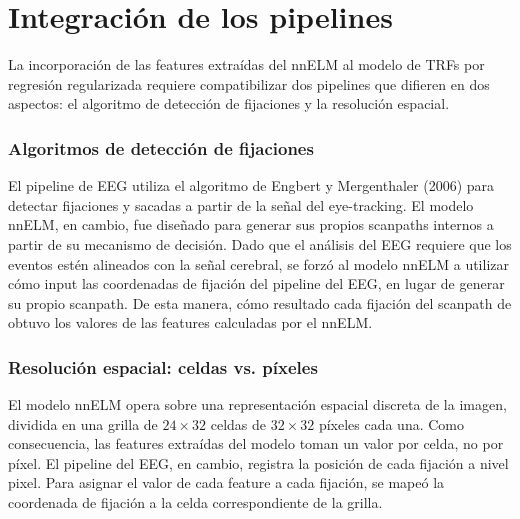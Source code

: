 \section{Integración de los pipelines}
\label{sec:celdas_vs_pixeles}


La incorporación de las features extraídas del nnELM al modelo de TRFs por regresión regularizada requiere compatibilizar dos pipelines que difieren en dos aspectos: el algoritmo de detección de fijaciones y la resolución espacial.

\subsubsection{Algoritmos de detección de fijaciones}

El pipeline de EEG utiliza el algoritmo de Engbert y Mergenthaler (2006) para detectar fijaciones y sacadas a partir de la señal del eye-tracking. El modelo nnELM, en cambio, fue diseñado para generar sus propios scanpaths internos a partir de su mecanismo de decisión. Dado que el análisis del EEG requiere que los eventos estén alineados con la señal cerebral, se forzó al modelo nnELM a utilizar cómo input las coordenadas de fijación del pipeline del EEG, en lugar de generar su propio scanpath. De esta manera, cómo resultado cada fijación del scanpath de \citet{care2025} obtuvo los valores de las features calculadas por el nnELM.

\subsubsection{Resolución espacial: celdas vs. píxeles}

El modelo nnELM opera sobre una representación espacial discreta de la imagen, dividida en una grilla de $24 \times 32$ celdas de $32 \times 32$ píxeles cada una. Como consecuencia, las features extraídas del modelo toman un valor por celda, no por píxel. El pipeline del EEG, en cambio, registra la posición de cada fijación a nivel pixel. Para asignar el valor de cada feature a cada fijación, se mapeó la coordenada de fijación a la celda correspondiente de la grilla.

